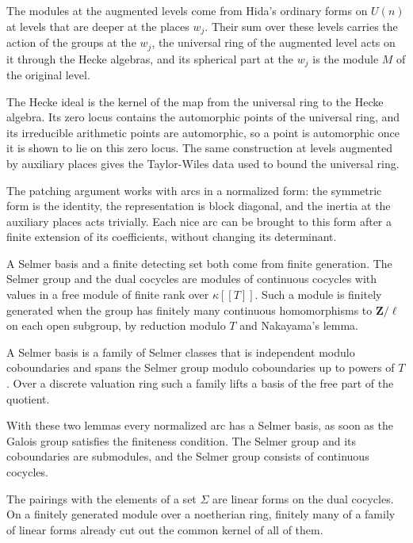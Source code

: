 The modules at the augmented levels come from Hida's ordinary forms on $U(n)$ at levels that are deeper at the places $w_j$. Their sum over these levels carries the action of the groups at the $w_j$, the universal ring of the augmented level acts on it through the Hecke algebras, and its spherical part at the $w_j$ is the module $M$ of the original level.

The Hecke ideal is the kernel of the map from the universal ring to the Hecke algebra. Its zero locus contains the automorphic points of the universal ring, and its irreducible arithmetic points are automorphic, so a point is automorphic once it is shown to lie on this zero locus. The same construction at levels augmented by auxiliary places gives the Taylor-Wiles data used to bound the universal ring.

The patching argument works with arcs in a normalized form: the symmetric form is the identity, the representation is block diagonal, and the inertia at the auxiliary places acts trivially. Each nice arc can be brought to this form after a finite extension of its coefficients, without changing its determinant.

A Selmer basis and a finite detecting set both come from finite generation. The Selmer group and the dual cocycles are modules of continuous cocycles with values in a free module of finite rank over $\kappa[[T]]$. Such a module is finitely generated when the group has finitely many continuous homomorphisms to $\mathbf Z/\ell$ on each open subgroup, by reduction modulo $T$ and Nakayama's lemma.

A Selmer basis is a family of Selmer classes that is independent modulo coboundaries and spans the Selmer group modulo coboundaries up to powers of $T$. Over a discrete valuation ring such a family lifts a basis of the free part of the quotient.

With these two lemmas every normalized arc has a Selmer basis, as soon as the Galois group satisfies the finiteness condition. The Selmer group and its coboundaries are submodules, and the Selmer group consists of continuous cocycles.

The pairings with the elements of a set $\Sigma$ are linear forms on the dual cocycles. On a finitely generated module over a noetherian ring, finitely many of a family of linear forms already cut out the common kernel of all of them.

